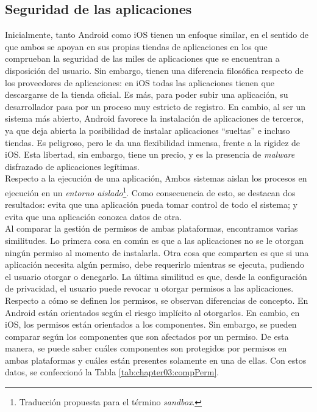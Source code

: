 \subsection{Seguridad de las aplicaciones}
Inicialmente, tanto Android como iOS tienen un enfoque similar, en el sentido de que ambos se apoyan en sus propias tiendas de aplicaciones en los que comprueban la seguridad de las miles de aplicaciones que se encuentran a disposición del usuario. Sin embargo, tienen una diferencia filosófica respecto de los proveedores de aplicaciones: en iOS todas las aplicaciones tienen que descargarse de la tienda oficial. Es más, para poder subir una aplicación, su desarrollador pasa por un proceso muy estricto de registro. En cambio, al ser un sistema más abierto, Android favorece la instalación de aplicaciones de terceros, ya que deja abierta la posibilidad de instalar aplicaciones ``sueltas'' e incluso tiendas. Es peligroso, pero le da una flexibilidad inmensa, frente a la rigidez de iOS. Esta libertad, sin embargo, tiene un precio, y es la presencia de \emph{malware} disfrazado de aplicaciones legítimas.\\
Respecto a la ejecución de una aplicación, Ambos sistemas aislan los procesos en ejecución en un \emph{entorno aislado}\footnote{Traducción propuesta para el término \textit{sandbox}.}. Como consecuencia de esto, se destacan dos resultados: evita que una aplicación pueda tomar control de todo el sistema; y evita que una aplicación conozca datos de otra.\\
Al comparar la gestión de permisos de ambas plataformas, encontramos varias similitudes. Lo primera cosa en común es que a las aplicaciones no se le otorgan ningún permiso al momento de instalarla. Otra cosa que comparten es que si una aplicación necesita algún permiso, debe requerirlo mientras se ejecuta, pudiendo el usuario otorgar o denegarlo. La última similitud es que, desde la configuración de privacidad, el usuario puede revocar u otorgar permisos a las aplicaciones.\\
Respecto a cómo se definen los permisos, se observan diferencias de concepto. En Android están orientados según el riesgo implícito al otorgarlos. En cambio, en iOS, los permisos están orientados a los componentes. Sin embargo, se pueden comparar según los componentes que son afectados por un permiso. De esta manera, se puede saber cuáles componentes son protegidos por permisos en ambas plataformas y cuáles están presentes solamente en una de ellas. Con estos datos, se confeccionó la Tabla \ref{tab:chapter03:compPerm}.\\
